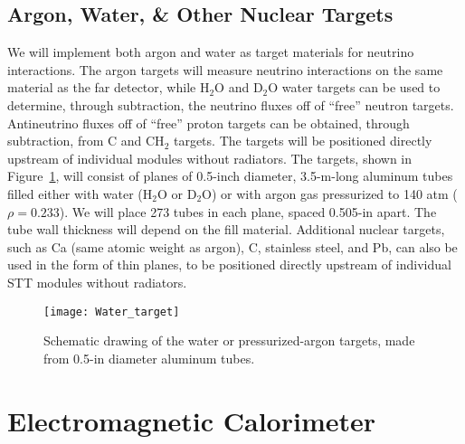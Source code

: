 \documentclass[aps,prl,preprint,groupedaddress]{revtex4}
\begin{document}
\subsection{Argon, Water, \& Other Nuclear Targets}

We will implement both argon
and water as target materials for neutrino interactions.
The argon targets will measure neutrino interactions on the same material as the far detector, while
H$_2$O and D$_2$O water targets can be used to determine, through subtraction, the
neutrino fluxes off of ``free'' neutron targets. Antineutrino fluxes off of ``free''
proton targets can be obtained, through subtraction, from C and CH$_2$ targets.
The targets will be 
positioned directly upstream of individual modules without radiators. 
The targets, shown in 
Figure~\ref{STT_targets}, will consist of planes of 0.5-inch diameter, 3.5-m-long aluminum tubes filled
either with water (H$_2$O or D$_2$O) or with argon gas pressurized to 140 atm ($\rho = 0.233$). 
We will place 273 tubes in each 
plane, spaced 0.505-in apart. The tube wall thickness will depend on the fill material.
Additional nuclear targets, such as Ca (same atomic weight as argon), C, stainless
steel, and Pb, can also be used in
the form of thin planes, to be positioned directly upstream of individual STT modules without radiators.

\begin{figure}
\begin{center}
\texttt{[image: Water\_target]}
\caption[Schematic drawing of the water or pressurized-argon targets]{\label{STT_targets} Schematic drawing of the water or pressurized-argon targets, 
made from 0.5-in diameter aluminum tubes.}
\end{center}
\end{figure}

\section{Electromagnetic Calorimeter}
\end{document}
